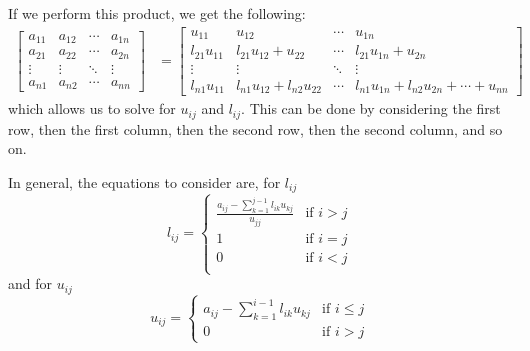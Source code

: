 \documentclass{article}
\begin{document}
If we perform this product, we get the following:
\begin{align*}
    \begin{bmatrix*}
        a_{11} & a_{12} & \cdots & a_{1n} \\
        a_{21} & a_{22} & \cdots & a_{2n} \\
        \vdots & \vdots & \ddots & \vdots \\
        a_{n1} & a_{n2} & \cdots & a_{nn}
    \end{bmatrix*} & = \begin{bmatrix*}
                           u_{11}        & u_{12} & \cdots & u_{1n} \\
                           l_{21} u_{11} & l_{21} u_{12} + u_{22} & \cdots & l_{21} u_{1n} + u_{2n} \\
                           \vdots        & \vdots & \ddots & \vdots \\
                           l_{n1} u_{11} & l_{n1} u_{12} + l_{n2} u_{22} & \cdots & l_{n1} u_{1n} + l_{n2} u_{2n} + \cdots + u_{nn}
                       \end{bmatrix*}
\end{align*}
which allows us to solve for \(u_{ij}\) and \(l_{ij}\). This can be done by
considering the first row, then the first column, then the second row, then the second column, and so on.

In general, the equations to consider are, for \(l_{ij}\)
\begin{equation*}
    l_{ij} = \begin{cases}
        \frac{a_{ij} - \sum_{k = 1}^{j - 1} l_{ik} u_{kj}}{u_{jj}} & \text{if \(i > j\)} \\
        1                                                          & \text{if \(i = j\)} \\
        0                                                          & \text{if \(i < j\)} \\
    \end{cases}
\end{equation*}
and for \(u_{ij}\)
\begin{equation*}
    u_{ij} = \begin{cases}
        a_{ij} - \sum_{k = 1}^{i - 1} l_{ik} u_{kj} & \text{if \(i \leq j\)} \\
        0                                           & \text{if \(i > j\)}
    \end{cases}
\end{equation*}
\end{document}

